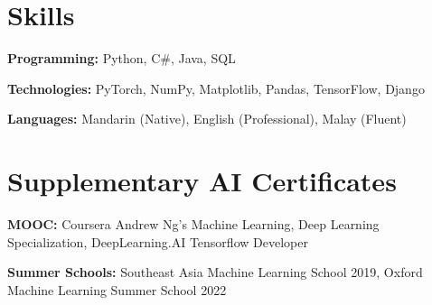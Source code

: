 \documentclass[letterpaper,11pt]{article}
\makeatletter
\newcommand{\resumeOrganizationHeading}[4]{
  \vspace{-2pt}\item
    \begin{tabular*}{0.97\textwidth}[t]{l@{\extracolsep{\fill}}r}
      \textbf{#1} & \textit{\small #2} \\
      \textit{\small#3}
    \end{tabular*}\vspace{-7pt}
}
\newcommand{\resumeSubHeadingListStart}{\begin{itemize}[leftmargin=0.15in, label={}]}
\newcommand{\resumeSubHeadingListEnd}{\end{itemize}}
\makeatother
\begin{document}
\section{Skills}
  \vspace{2pt}
  \resumeSubHeadingListStart
    \small{\item{
        \textbf{Programming: }{Python, C\#, Java, SQL} \\ \vspace{3pt}
        
        \textbf{Technologies: }{PyTorch, NumPy, Matplotlib, Pandas, TensorFlow, Django} \\ \vspace{3pt}
        
        \textbf{Languages: }{Mandarin (Native), English (Professional), Malay (Fluent)}
        
    }}
  \resumeSubHeadingListEnd


\section{Supplementary AI Certificates}
  \vspace{2pt}
  \resumeSubHeadingListStart
    \small{\item{
        \textbf{MOOC:}{ Coursera Andrew Ng’s Machine Learning, Deep Learning
Specialization, DeepLearning.AI Tensorflow Developer} \\ \vspace{3pt}
        
        \textbf{Summer Schools:}{ Southeast Asia Machine Learning School 2019, Oxford Machine Learning Summer School 2022}
    }}
  \resumeSubHeadingListEnd


\end{document}
